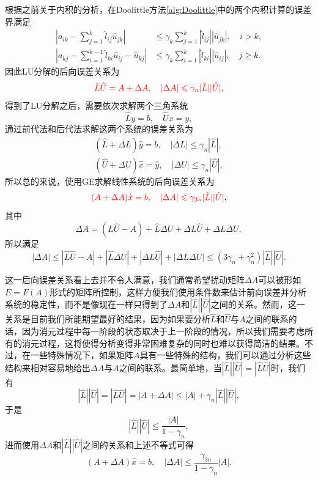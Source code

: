 \documentclass[a4paper,10pt]{ctexart}
\begin{document}
根据之前关于内积的分析，在Doolittle方法\ref{alg:Doolittle}中的两个内积计算的误差界满足
\[
    \begin{aligned}
        \left\vert a_{ik} - \sum_{j=1}^{k}\hat{l}_{ij} \hat{u}_{jk} \right\vert &\leqslant \gamma_k \sum_{j=1}^k |\hat{l}_{ij}| |\hat{u}_{jk}|,\quad i>k,\\
        \left\vert a_{kj} - \sum_{i=1}^{k-1}\hat{l}_{ki} \hat{u}_{ij} - \hat{u}_{kj} \right\vert &\leqslant \gamma_k \sum_{i=1}^k |\hat{l}_{ki}| |\hat{u}_{ij}|,\quad j\geqslant k.
    \end{aligned}
\]
因此LU分解的后向误差关系为
\begin{equation}
    \textcolor{red}{\hat{L} \hat{U} = A + \Delta A, \quad |\Delta A| \leqslant \gamma_n |\hat{L}| |\hat{U}|},
\end{equation}
得到了LU分解之后，需要依次求解两个三角系统
\[
    \hat{L} y = b, \quad \hat{U} x = y,
\]
通过前代法和后代法求解这两个系统的误差关系为
\[
    \begin{aligned}
        (\hat{L}+\Delta L) \hat{y} = b, \quad |\Delta L| \leqslant \gamma_{n} |\hat{L}|,\\
        (\hat{U}+\Delta U) \hat{x} = \hat{y}, \quad |\Delta U| \leqslant \gamma_{n} |\hat{U}|,
    \end{aligned}
\]
所以总的来说，使用GE求解线性系统的后向误差关系为
\begin{equation}\label{eq:GEbackerror}
    \textcolor{red}{(A + \Delta A) \hat{x} = b, \quad |\Delta A| \leqslant \gamma_{3n} |\hat{L}| |\hat{U}|},
\end{equation}
其中
\[
    \Delta A = (\hat{L} \hat{U}-A) + \hat{L} \Delta U + \Delta L \hat{U} + \Delta L \Delta U,
\]
所以满足
\[
    |\Delta A| \leqslant  |\hat{L} \hat{U}-A| + |\hat{L} \Delta U| + |\Delta L \hat{U}| + |\Delta L \Delta U| \leqslant (3\gamma_{n} + \gamma_n^2) |\hat{L}| |\hat{U}|.
\]

这一后向误差关系看上去并不令人满意，我们通常希望扰动矩阵$ \Delta A $可以被形如$ E = F(A) $形式的矩阵所控制，这样方便我们使用条件数来估计前向误差并分析系统的稳定性，而不是像现在一样只得到了$ \Delta A $和$ |\hat{L}| |\hat{U}| $之间的关系。然而，这一关系是目前我们所能期望最好的结果，因为如果要分析$ \hat{L} $和$ \hat{U} $与$ A $之间的联系的话，因为消元过程中每一阶段的状态取决于上一阶段的情况，所以我们需要考虑所有的消元过程，这将使得分析变得非常困难复杂的同时也难以获得简洁的结果。不过，在一些特殊情况下，如果矩阵$ A $具有一些特殊的结构，我们可以通过分析这些结构来相对容易地给出$ \Delta A $与$ A $之间的联系。最简单地，当$ |\hat{L}| |\hat{U}|=|\hat{L} \hat{U}| $时，我们有
\[
    |\hat{L}| |\hat{U}| = |\hat{L} \hat{U}| = |A+\Delta A| \leqslant |A| + \gamma_n |\hat{L}| |\hat{U}|,
\]
于是
\[
    |\hat{L}| |\hat{U}| \leqslant \frac{|A|}{1-\gamma_n},
\]
进而使用$ \Delta A $和$ |\hat{L}| |\hat{U}| $之间的关系和上述不等式可得
\begin{equation}
    (A+\Delta A) \hat{x} = b,\quad |\Delta A| \leqslant \frac{\gamma_{3n}}{1-\gamma_n}|A|.
\end{equation}
\end{document}
